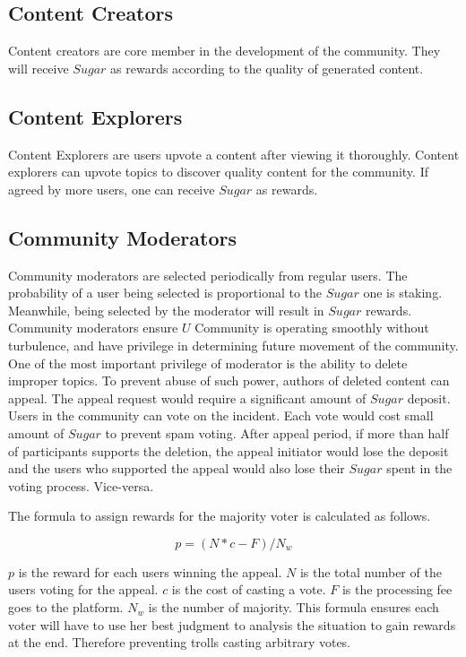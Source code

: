 \subsection{Content Creators}
Content creators are core member in the development of the community. They will receive $Sugar$ as rewards according to the quality of generated content. 
\subsection{Content Explorers}
Content Explorers are users upvote a content after viewing it thoroughly. Content explorers can upvote topics to discover quality content for the community. If agreed by more users, one can receive $Sugar$ as rewards. 
\subsection{Community Moderators}
Community moderators are selected periodically from regular users. The probability of a user being selected is proportional to the $Sugar$ one is staking. Meanwhile, being selected by the moderator will result in $Sugar$ rewards.
Community moderators ensure $U$ Community is operating smoothly without turbulence, and have privilege in determining future movement of the community. One of the most important privilege of moderator is the ability to delete improper topics. To prevent abuse of such power, authors of  deleted content can appeal. The appeal request would require a significant amount of $Sugar$ deposit. Users in the community can vote on the incident. Each vote would cost small amount of $Sugar$ to prevent spam voting. After appeal period, if more than half of participants supports the deletion, the appeal initiator would lose the deposit and the users who supported the appeal would also lose their $Sugar$ spent in the voting process. Vice-versa. \par
The formula to assign rewards for the majority voter is calculated as follows. 
\begin{center}
    $${p}=({N}*{c} - {F})/{N_w}$$
\end{center}
$p$ is the reward for each users winning the appeal. $N$ is the total number of the users voting for the appeal. $c$ is the cost of casting a vote. $F$ is the processing fee goes to the platform. $N_w$ is the number of majority. This formula ensures each voter will have to use her best judgment to analysis the situation to gain rewards at the end. Therefore preventing trolls casting arbitrary votes. \par
